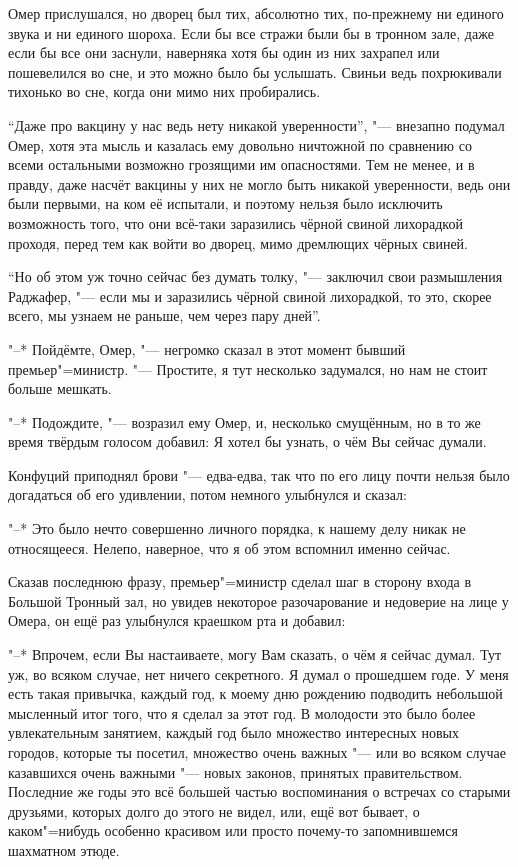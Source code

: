Омер прислушался, но дворец был тих, абсолютно тих, по-прежнему ни единого звука
и ни единого шороха.
Если бы все стражи были бы в тронном зале, даже если бы все они заснули,
наверняка хотя бы один из них захрапел или пошевелился во сне, и это можно было
бы услышать.
Свиньи ведь похрюкивали тихонько во сне, когда они мимо них пробирались.

\enquote{Даже про вакцину у нас ведь нету никакой уверенности}, "--- внезапно
подумал Омер, хотя эта мысль и казалась ему довольно ничтожной по сравнению со
всеми остальными возможно грозящими им опасностями.
Тем не менее, и в правду, даже насчёт вакцины у них не могло быть никакой
уверенности, ведь они были первыми, на ком её испытали, и поэтому нельзя было
исключить возможность того, что они всё-таки заразились чёрной свиной лихорадкой
проходя, перед тем как войти во дворец, мимо дремлющих чёрных свиней.

\enquote{Но об этом уж точно сейчас без думать толку, "--- заключил свои размышления
Раджафер, "--- если мы и заразились чёрной свиной лихорадкой, то это, скорее
всего, мы узнаем не раньше, чем через пару дней}.

"--* Пойдёмте, Омер, "--- негромко сказал в этот момент бывший премьер"=министр.
"--- Простите, я тут несколько задумался, но нам не стоит больше мешкать.

"--* Подождите, "--- возразил ему Омер, и, несколько смущённым, но в то же время
твёрдым голосом добавил: Я хотел бы узнать, о чём Вы сейчас думали.

Конфуций приподнял брови "--- едва-едва, так что по его лицу почти нельзя было
догадаться об его удивлении, потом немного улыбнулся и сказал:

"--* Это было нечто совершенно личного порядка, к нашему делу никак не
относящееся.
Нелепо, наверное, что я об этом вспомнил именно сейчас.

Сказав последнюю фразу, премьер"=министр сделал шаг в сторону входа в Большой
Тронный зал, но увидев некоторое разочарование и недоверие на лице у Омера, он
ещё раз улыбнулся краешком рта и добавил:

"--* Впрочем, если Вы настаиваете, могу Вам сказать, о чём я сейчас думал.
Тут уж, во всяком случае, нет ничего секретного.
Я думал о прошедшем годе.
У меня есть такая привычка, каждый год, к моему дню рождению подводить небольшой
мысленный итог того, что я сделал за этот год.
В молодости это было более увлекательным занятием, каждый год было множество
интересных новых городов, которые ты посетил, множество очень важных "--- или во
всяком случае казавшихся очень важными "--- новых законов, принятых
правительством.
Последние же годы это всё большей частью воспоминания о встречах со старыми
друзьями, которых долго до этого не видел, или, ещё вот бывает, о каком"=нибудь
особенно красивом или просто почему-то запомнившемся шахматном этюде.

